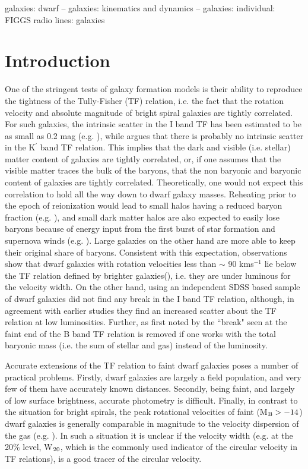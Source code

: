 \documentclass[useAMS,usenatbib]{mn2e}
\begin{document}
\begin{keywords}
          galaxies: dwarf --
          galaxies: kinematics and dynamics --
          galaxies: individual: FIGGS
          radio lines: galaxies
\end{keywords}

\section{Introduction}
\label{sec:intro}

    One of the stringent tests of galaxy formation models is their ability to reproduce the tightness of the Tully-Fisher (TF) relation, i.e. the fact that the rotation velocity and absolute magnitude of bright spiral galaxies are tightly correlated. For such galaxies, the intrinsic scatter in the I band TF has been estimated to be as small as 0.2 mag (e.g. \cite{sakai00}), while \cite{verheijen01} argues that there is probably no intrinsic scatter in the K$^{'}$ band TF relation. This implies that the dark and visible (i.e. stellar) matter content of galaxies are tightly correlated, or, if one assumes that the visible matter traces the bulk of the baryons, that the non baryonic and baryonic content of galaxies are tightly correlated. Theoretically, one would not expect this correlation to hold all the way down to dwarf galaxy masses. Reheating prior to the epoch of reionization would lead to small halos having a reduced baryon fraction (e.g. \cite{gnedin00}), and small dark matter halos are also expected to easily lose baryons because of energy input from  the first burst of star formation  and supernova winds (e.g. \citealp{ts07,dw03,ef00}). Large galaxies on the other hand are more able to keep their original share of baryons.  Consistent with this expectation, observations show that dwarf galaxies with  rotation velocities less than  $\sim$ 90 kms$^{-1}$ lie below the  TF relation defined by brighter galaxies(\citealp{mg00,bc04,mg05}), i.e. they are under luminous for the velocity width. On the other hand, \cite{geha06} using an independent SDSS based sample of dwarf galaxies did not find any break in the I band TF relation, although, in agreement with earlier studies they find an increased scatter about the TF relation at low luminosities. Further, as first noted by \cite{mg00} the ``break" seen at the faint end of the  B band TF relation is removed  if one works with the total baryonic mass (i.e. the sum of stellar and gas)  instead of the luminosity.

    Accurate extensions of the TF relation to faint dwarf galaxies poses a number of practical problems. Firstly, dwarf galaxies are largely a field population, and very few of them have accurately known distances. Secondly, being faint, and largely of low surface brightness, accurate photometry is difficult. Finally, in contrast to the situation for bright spirals, the peak rotational velocities of faint (M$_{\rm B} > -14$) dwarf galaxies is generally comparable in magnitude to the velocity dispersion of the gas (e.g. \citealp{b1,bc04}). In such a situation it is unclear if the velocity width (e.g. at the 20\% level, W$_{\rm 20}$, which is the commonly used indicator of the circular velocity in TF relations), is a good tracer of the circular velocity. 
\end{document}

